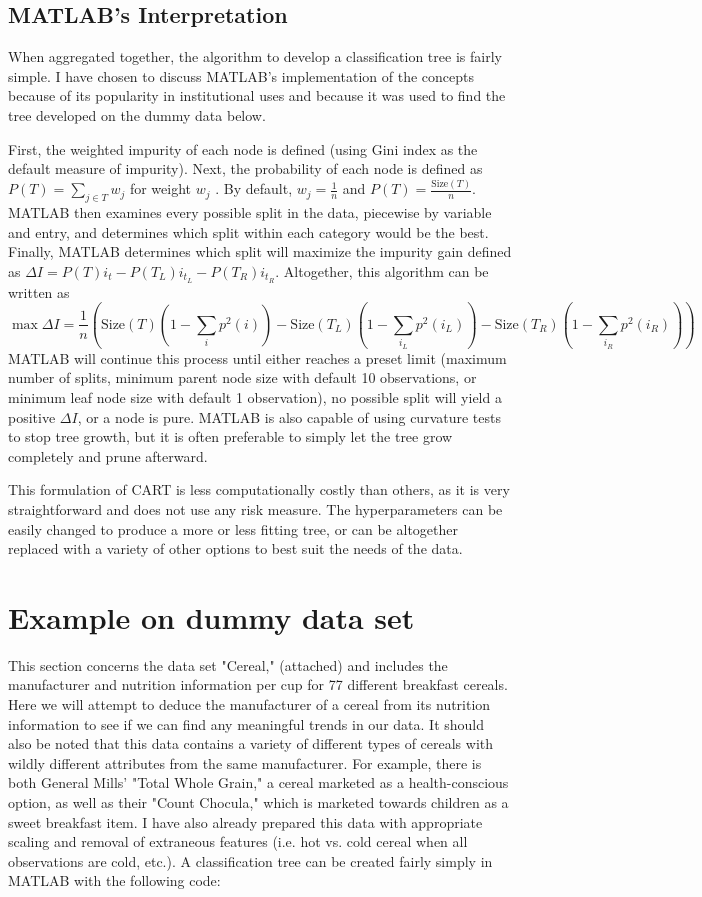 \documentclass[12pt,english,letterpaper]{article}
\begin{document}
\subsection*{MATLAB's Interpretation}
When aggregated together, the algorithm to develop a classification tree is fairly simple. I have chosen to discuss MATLAB's implementation of the concepts because of its popularity in institutional uses and because it was used to find the tree developed on the dummy data below. \cite{matlab}

First, the weighted impurity of each node is defined (using Gini index as the default measure of impurity). Next, the probability of each node is defined as $P(T)=\sum_{j\in T} w_j$ for weight $w_j$ . By default, $w_j=\frac{1}{n}$ and $P(T)=\frac{\text{Size}(T)}{n}$. MATLAB then examines every possible split in the data, piecewise by variable and entry, and determines which split within each category would be the best. Finally, MATLAB determines which split will maximize the impurity gain defined as $\Delta I=P(T)i_t - P(T_L)i_{t_L} - P(T_R)i_{t_R}$.  Altogether, this algorithm can be written as
$$
\max \Delta I = \frac{1}{n} ({\text{Size}(T)}(1-\sum_i p^2(i)) - {\text{Size}(T_L)}(1-\sum_{i_L} p^2(i_L)) - {\text{Size}(T_R)}(1-\sum_{i_R} p^2(i_R)))
$$
MATLAB will continue this process until either reaches a preset limit (maximum number of splits, minimum parent node size with default 10 observations, or minimum leaf node size with default 1 observation), no possible split will yield a positive $\Delta I$, or a node is pure. MATLAB is also capable of using curvature tests to stop tree growth, but it is often preferable to simply let the tree grow completely and prune afterward.

This formulation of CART is less computationally costly than others, as it is very straightforward and does not use any risk measure. The hyperparameters can be easily changed to produce a more or less fitting tree, or can be altogether replaced with a variety of other options to best suit the needs of the data.

\section{Example on dummy data set}

This section concerns the data set "Cereal," (attached) and includes the manufacturer and nutrition information per cup for 77 different breakfast cereals. Here we will attempt to deduce the manufacturer of a cereal from its nutrition information to see if we can find any meaningful trends in our data. It should also be noted that this data contains a variety of different types of cereals with wildly different attributes from the same manufacturer. For example, there is both General Mills' "Total Whole Grain," a cereal marketed as a health-conscious option, as well as their "Count Chocula," which is marketed towards children as a sweet breakfast item. I have also already prepared this data with appropriate scaling and removal of extraneous features (i.e. hot vs. cold cereal when all observations are cold, etc.). A classification tree can be created fairly simply in MATLAB with the following code:
\end{document}
